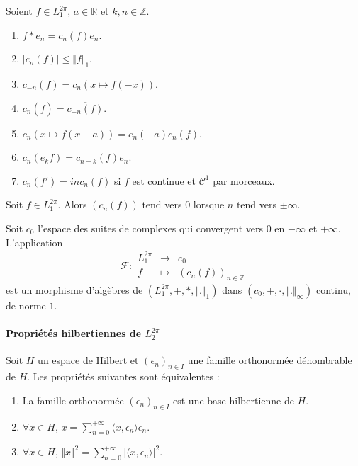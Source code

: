   \begin{proposition}
    Soient $f \in L_1^{2 \pi}$, $a \in \mathbb{R}$ et $k, n \in \mathbb{Z}$.
    \begin{enumerate}[label={\bfseries(\roman*)}]
      \item $f * e_n = c_n(f) e_n$.
      \item $\vert c_n(f) \vert \leq \Vert f \Vert_1$.
      \item $c_{-n}(f) = c_n(x \mapsto f(-x))$.
      \item $c_n(\overline{f}) = \overline{c_{-n}(f)}$.
      \item $c_n(x \mapsto f(x-a)) = e_n(-a) c_n(f)$.
      \item $c_n(e_k f) = c_{n-k}(f) e_n$.
      \item $c_n(f') = in c_n(f)$ si $f$ est continue et $\mathcal{C}^1$ par morceaux.
    \end{enumerate}
  \end{proposition}


  \begin{lemma}
    Soit $f \in L_1^{2 \pi}$. Alors $(c_n(f))$ tend vers $0$ lorsque $n$ tend vers $\pm \infty$.
  \end{lemma}

  \begin{theorem}
    \label{246-1}
    Soit $c_0$ l'espace des suites de complexes qui convergent vers $0$ en $-\infty$ et $+\infty$. L'application
    \[
    \mathcal{F} :
    \begin{array}{ccc}
      L_1^{2\pi} &\rightarrow& c_0 \\
      f &\mapsto& (c_n(f))_{n \in \mathbb{Z}}
    \end{array}
    \]
    est un morphisme d'algèbres de $(L_1^{2\pi}, +, *, \Vert . \Vert_1)$ dans $(c_0, +, \cdot, \Vert . \Vert_\infty)$ continu, de norme $1$.
  \end{theorem}

  \paragraph{Propriétés hilbertiennes de \texorpdfstring{$L_2^{2 \pi}$}{L₂²ᵖⁱ}}


  \begin{theorem}
    \label{246-2}
    Soit $H$ un espace de Hilbert et $(\epsilon_n)_{n \in I}$ une famille orthonormée dénombrable de $H$. Les propriétés suivantes sont équivalentes :
    \begin{enumerate}[label={\bfseries(\roman*)}]
      \item La famille orthonormée $(\epsilon_n)_{n \in I}$ est une base hilbertienne de $H$.
      \item $\forall x \in H, \, x = \sum_{n=0}^{+\infty} \langle x, \epsilon_n \rangle \epsilon_n$.
      \item \label{246-3} $\forall x \in H, \, \Vert x \Vert^2 = \sum_{n=0}^{+\infty} \vert \langle x, \epsilon_n \rangle \vert^2$.
    \end{enumerate}
  \end{theorem}

